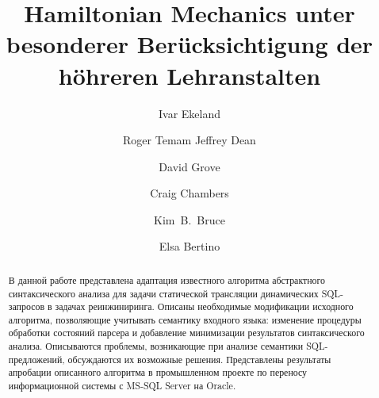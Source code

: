 \documentclass{llncs}
\begin{document}
%
%
%
%
\tableofcontents
%
\mainmatter              %
%
\title{Hamiltonian Mechanics unter besonderer Ber\"ucksichtigung der
h\"ohreren Lehranstalten}
%
%
\author{Ivar Ekeland \and Roger Temam
Jeffrey Dean \and David Grove \and Craig Chambers \and Kim~B.~Bruce \and
Elsa Bertino}
%
%
%

\maketitle              %

\begin{abstract}
В данной работе представлена адаптация известного алгоритма абстрактного синтаксического анализа для задачи статической трансляции динамических SQL-запросов в задачах реинжиниринга. Описаны необходимые модификации исходного алгоритма, позволяющие учитывать семантику входного языка: изменение процедуры обработки состояний парсера и добавление минимизации результатов синтаксического анализа. Описываются проблемы, возникающие при анализе  семантики SQL-предложений,  обсуждаются их возможные решения. Представлены результаты апробации описанного алгоритма в промышленном проекте по переносу информационной системы с MS-SQL Server на Oracle.

\end{abstract}
%
\end{document}
